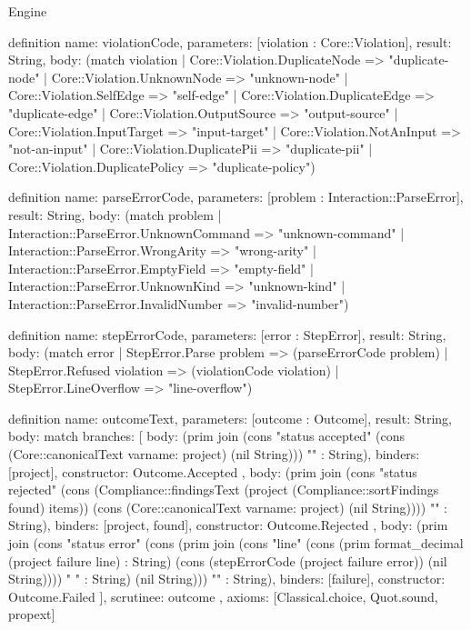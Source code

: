 \begin{lexlean}{Engine}
\begin{semanticmodule}
definition{
  name: violationCode,
  parameters: [violation : Core::Violation],
  result: String,
  body: (match violation
    | Core::Violation.DuplicateNode => "duplicate-node"
    | Core::Violation.UnknownNode => "unknown-node"
    | Core::Violation.SelfEdge => "self-edge"
    | Core::Violation.DuplicateEdge => "duplicate-edge"
    | Core::Violation.OutputSource => "output-source"
    | Core::Violation.InputTarget => "input-target"
    | Core::Violation.NotAnInput => "not-an-input"
    | Core::Violation.DuplicatePii => "duplicate-pii"
    | Core::Violation.DuplicatePolicy => "duplicate-policy")
}

definition{
  name: parseErrorCode,
  parameters: [problem : Interaction::ParseError],
  result: String,
  body: (match problem
    | Interaction::ParseError.UnknownCommand => "unknown-command"
    | Interaction::ParseError.WrongArity => "wrong-arity"
    | Interaction::ParseError.EmptyField => "empty-field"
    | Interaction::ParseError.UnknownKind => "unknown-kind"
    | Interaction::ParseError.InvalidNumber => "invalid-number")
}

definition{
  name: stepErrorCode,
  parameters: [error : StepError],
  result: String,
  body: (match error
    | StepError.Parse problem => (parseErrorCode problem)
    | StepError.Refused violation => (violationCode violation)
    | StepError.LineOverflow => "line-overflow")
}

definition{
  name: outcomeText,
  parameters: [outcome : Outcome],
  result: String,
  body: match{
    branches: [
      {
        body: (prim join (cons "status accepted" (cons (Core::canonicalText var{name: project}) (nil String))) "" : String),
        binders: [project],
        constructor: Outcome.Accepted
      },
      {
        body: (prim join (cons "status rejected" (cons (Compliance::findingsText (project (Compliance::sortFindings found) items)) (cons (Core::canonicalText var{name: project}) (nil String)))) "" : String),
        binders: [project, found],
        constructor: Outcome.Rejected
      },
      {
        body: (prim join (cons "status error\n" (cons (prim join (cons "line" (cons (prim format_decimal (project failure line) : String) (cons (stepErrorCode (project failure error)) (nil String)))) " " : String) (nil String))) "" : String),
        binders: [failure],
        constructor: Outcome.Failed
      }
    ],
    scrutinee: outcome
  },
  axioms: [Classical.choice, Quot.sound, propext]
}
\end{semanticmodule}
\end{lexlean}

